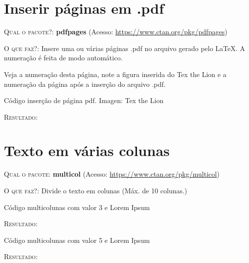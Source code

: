\documentclass[a4paper,12pt,oneside,openright,extrafontsizes,openbib]{memoir}
\begin{document}
{\chapter{Inserir páginas em .pdf}

\textsc{Qual o pacote?}: \textbf{pdfpages} (Acesso: \url{https://www.ctan.org/pkg/pdfpages})

\textsc{O que faz?}: Insere uma ou várias páginas .pdf no arquivo gerado pelo \LaTeX. A numeração é feita de modo automático.

Veja a numeração desta página, note a figura inserida do Tex the Lion e a numeração da página após a inserção do arquivo .pdf.
\ \\

\begin{codex}{Código inserção de página pdf. Imagen: Tex the Lion}
	
\end{codex}

\textsc{Resultado}:


\chapter{Texto em várias colunas}

\textsc{Qual o pacote:} \textbf{multicol} (Acesso: \url{https://www.ctan.org/pkg/multicol})

\textsc{O que faz?}: Divide o texto em colunas (Máx. de 10 colunas.)

\begin{codex}{Código multicolunas com valor 3 e Lorem Ipsum}
	\begin{multicols}{3}
		\lipsum[2]
	\end{multicols}
\end{codex}

\textsc{Resultado}:

\begin{multicols}{3}
	\lipsum[2]
\end{multicols}

\begin{codex}{Código multicolunas com valor 5 e Lorem Ipsum}
	\begin{multicols}{5}
		\lipsum[2]
	\end{multicols}
\end{codex}

\textsc{Resultado}:

\begin{multicols}{5}
	\lipsum[2]
\end{multicols}

}
\end{document}
